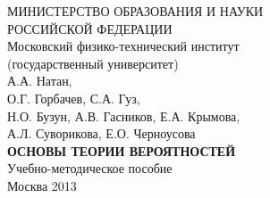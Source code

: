 \begin{center}

МИНИСТЕРСТВО ОБРАЗОВАНИЯ И НАУКИ \\
РОССИЙСКОЙ ФЕДЕРАЦИИ \\

 $ $ \\

Московский физико-технический институт \\
(государственный университет) \\
 
  $ $ \\ $ $ \\ $ $ \\
  $ $ \\
А.А. Натан, \\
О.Г. Горбачев, С.А. Гуз, \\
Н.О. Бузун, А.В. Гасников, Е.А. Крымова, \\
А.Л. Суворикова, Е.О. Черноусова \\
 
 $ $ \\ $ $ \\
 
\textbf{ОСНОВЫ ТЕОРИИ ВЕРОЯТНОСТЕЙ} \\
 
 $ $ \\
  $ $ \\
  $ $ \\
Учебно-методическое пособие \\
 
  $ $ \\ $ $ \\ $ $ \\ $ $ \\
 $ $ \\ $ $ \\ $ $ \\ $ $ \\ $ $ \\ $ $ \\
 
Москва 2013


\end{center}

\newpage